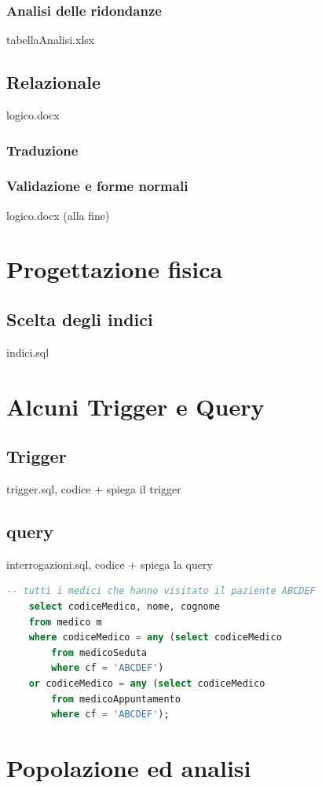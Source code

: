 \documentclass[11pt]{article}
\begin{document}
\subsubsection{Analisi delle ridondanze}
tabellaAnalisi.xlsx

\subsection{Relazionale}
logico.docx
\subsubsection{Traduzione}
\subsubsection{Validazione e forme normali}
logico.docx (alla fine)


\section{Progettazione fisica}
\subsection{Scelta degli indici}
indici.sql


\section{Alcuni Trigger e Query}
\subsection{Trigger}
trigger.sql, codice + spiega il trigger
\subsection{query}
interrogazioni.sql, codice + spiega la query
\begin{lstlisting}[language=SQL]
    -- tutti i medici che hanno visitato il paziente ABCDEF
    select codiceMedico, nome, cognome
    from medico m
    where codiceMedico = any (select codiceMedico
        from medicoSeduta
        where cf = 'ABCDEF')
    or codiceMedico = any (select codiceMedico
        from medicoAppuntamento
        where cf = 'ABCDEF');
\end{lstlisting}


\section{Popolazione ed analisi}
\end{document}
